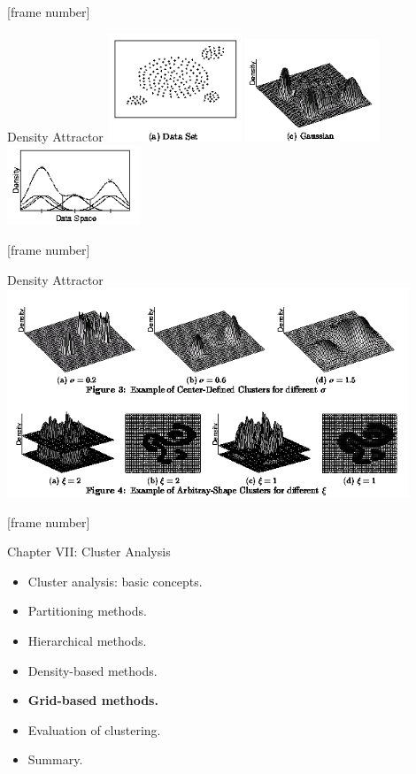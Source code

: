 \documentclass[aspectratio=169,t,xcolor=dvipsnames]{beamer}
\begin{document}
  {
    [frame number]
    \begin{frame}{Density Attractor}
      \centering
      \vspace{1cm}
      \includegraphics[width=4cm]{img/densityattractor.png}
      \includegraphics[width=4cm]{img/densityattractor1.png}
      \includegraphics[width=4cm]{img/densityattractor2.png}
    \end{frame}
  }

  {
    [frame number]
    \begin{frame}{Density Attractor}
      \centering
      \includegraphics[width=12cm]{img/densities.png}
    \end{frame}
  }

  {
    [frame number]
    \begin{frame}{Chapter VII: Cluster Analysis}
        \begin{itemize}
            \item Cluster analysis: basic concepts.
            \item Partitioning methods.
            \item Hierarchical methods.
            \item Density-based methods.
            \item \textbf{Grid-based methods.}
            \item Evaluation of clustering.
            \item Summary.
        \end{itemize}
    \end{frame}
  }
\end{document}
